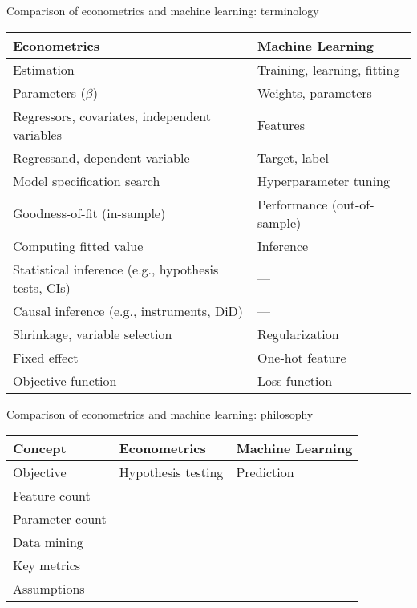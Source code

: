 \documentclass[xcolor=table, aspectratio=169]{beamer}
\begin{document}
\begin{frame}{Comparison of econometrics and machine learning: terminology}
    \begin{center}
\begin{tabular}{ll}
\textbf{Econometrics} & \textbf{Machine Learning} \\
\midrule
Estimation & Training, learning, fitting \\
Parameters ($\beta$) & Weights, parameters \\
Regressors, covariates, independent variables & Features \\
Regressand, dependent variable & Target, label \\
Model specification search & Hyperparameter tuning \\
Goodness-of-fit (in-sample) & Performance (out-of-sample) \\
Computing fitted value & Inference \\
Statistical inference (e.g., hypothesis tests, CIs) \hspace{6pt}  & --- \\
Causal inference (e.g., instruments, DiD) & --- \\
Shrinkage, variable selection & Regularization \\
Fixed effect & One-hot feature \\
Objective function & Loss function \\
\midrule
\end{tabular}
    \end{center}
\end{frame}

\begin{frame}{Comparison of econometrics and machine learning: philosophy}
    \begin{center}
\begin{tabular}{lll}
\textbf{Concept} & \textbf{Econometrics} \hspace{2.5cm} & \textbf{Machine Learning} \hspace{2cm} \\
\midrule
Objective & Hypothesis testing & Prediction \\[12pt]
Feature count & & \\[12pt]
Parameter count & & \\[12pt]
Data mining & & \\[12pt]
Key metrics & & \\[12pt]
Assumptions & & \\[12pt]
\midrule

\end{tabular}
    \end{center}
\end{frame}
\end{document}
